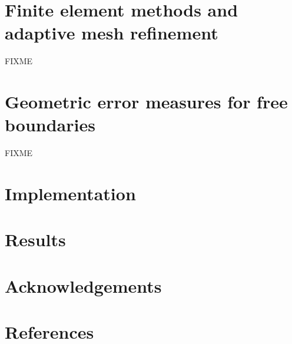 \documentclass[]{interact}
\theoremstyle{plain}%
\theoremstyle{definition}
\theoremstyle{remark}
\begin{document}
\section{Finite element methods and adaptive mesh refinement} \label{sec:fem}

FIXME \cite{ElmanSilvesterWathen2014} \cite{Suttmeier2008}


\section{Geometric error measures for free boundaries} \label{sec:geometric}

FIXME \cite{Kosub2016} \cite{JungeblutKleistMiltzow2022}

\section{Implementation} \label{sec:implementation}

\section{Results} \label{sec:results}



\section*{Acknowledgements}





\section{References}





\end{document}
